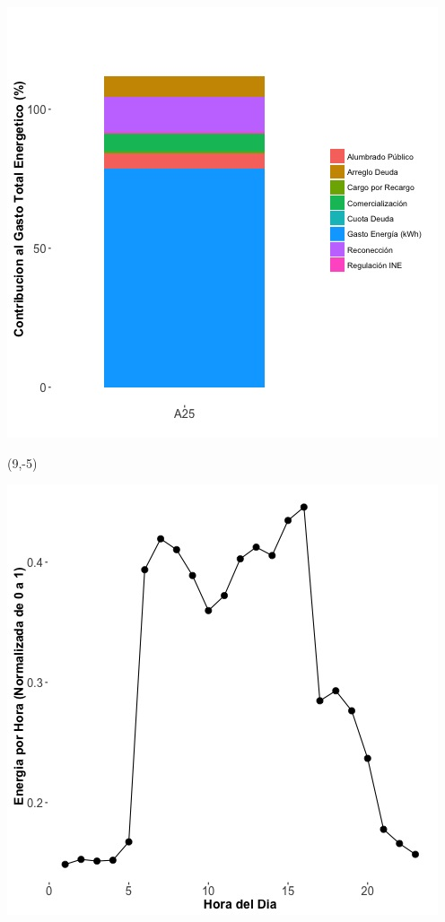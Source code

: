 \documentclass{article}\usepackage[]{graphicx}\usepackage[]{color}
\newenvironment{knitrout}{}{} %
\begin{document}
\begin{knitrout}
\color{fgcolor}
\includegraphics[scale=0.65]{figure/A25_costvars_plot.jpg} 
\end{knitrout}

 \begin{textblock}{1}(9,-5)
\begin{minipage}{20em}
\begingroup

\endgroup
\end{minipage}
\end{textblock}



\begin{knitrout}
\color{fgcolor}
\includegraphics[scale=0.65]{figure/A25_plot_norm_median} 
\end{knitrout}
\end{document}
